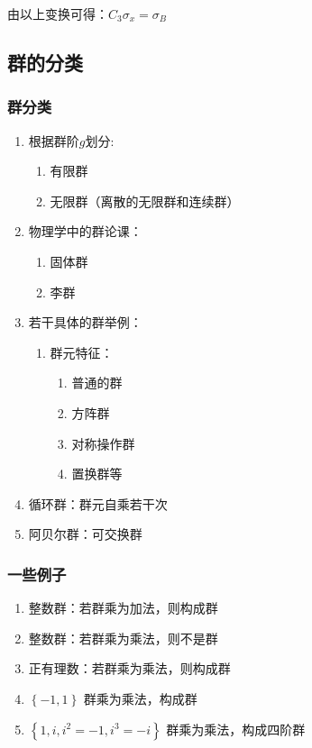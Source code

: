 \documentclass[math=mtpro2,lang=cn,color=green]{elegantbook}
\begin{document}
\begin{note}
由以上变换可得：$C_3\sigma_x =\sigma_B$
\end{note}

\subsection{群的分类}

\subsubsection{群分类}

\begin{enumerate}
   \item 根据群阶$g$划分:
      \begin{enumerate}
	 \item 有限群
	 \item 无限群（离散的无限群和连续群）
      \end{enumerate}
   \item 物理学中的群论课：
      \begin{enumerate}
	 \item 固体群
	 \item 李群
      \end{enumerate}
   \item 若干具体的群举例：
      \begin{enumerate}
	 \item 群元特征：
	    \begin{enumerate}
	       \item 普通的群
	       \item 方阵群
	       \item 对称操作群
	       \item 置换群等
	    \end{enumerate}
      \end{enumerate}
   \item 循环群：群元自乘若干次
   \item 阿贝尔群：可交换群
\end{enumerate}

\subsubsection{一些例子}

\begin{enumerate}
   \item 整数群：若群乘为加法，则构成群
   \item 整数群：若群乘为乘法，则不是群
   \item 正有理数：若群乘为乘法，则构成群
   \item $\left\{ -1,1 \right\}$ 群乘为乘法，构成群
   \item $\left\{ 1,i,i^2=-1,i^3=-i \right\}$ 群乘为乘法，构成四阶群
\end{enumerate}
\end{document}
